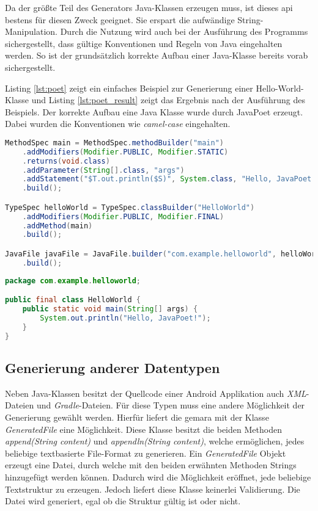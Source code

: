 Da der größte Teil des Generators Java-Klassen erzeugen muss, ist dieses \ac{api} bestens für diesen Zweck geeignet. Sie erspart die aufwändige String-Manipulation. Durch die Nutzung wird auch bei der Ausführung des Programms sichergestellt, dass gültige Konventionen und Regeln von Java eingehalten werden. So ist der grundsätzlich korrekte Aufbau einer Java-Klasse bereits vorab sichergestellt.

Listing \ref{lst:poet} zeigt ein einfaches Beispiel zur Generierung einer Hello-World-Klasse und Listing \ref{lst:poet_result} zeigt das Ergebnis nach der Ausführung des Beispiels. Der korrekte Aufbau eine Java Klasse wurde durch JavaPoet erzeugt. Dabei wurden die Konventionen wie \textit{camel-case} eingehalten.

\begin{lstlisting}[label=lst:poet,
language=java,
firstnumber=1,
caption=Beispiel für die Generation einer Hallo-World-Klasse mit JavaPoet \cite{poet}.]				   
MethodSpec main = MethodSpec.methodBuilder("main")
	.addModifiers(Modifier.PUBLIC, Modifier.STATIC)
	.returns(void.class)
	.addParameter(String[].class, "args")
	.addStatement("$T.out.println($S)", System.class, "Hello, JavaPoet!")
	.build();

TypeSpec helloWorld = TypeSpec.classBuilder("HelloWorld")
	.addModifiers(Modifier.PUBLIC, Modifier.FINAL)
	.addMethod(main)
	.build();

JavaFile javaFile = JavaFile.builder("com.example.helloworld", helloWorld)
	.build();
\end{lstlisting}

\begin{lstlisting}[label=lst:poet_result,
language=java,
firstnumber=1,
caption=Ergebnis der Generation von Listing \ref{lst:poet} \cite{poet}.]				   
package com.example.helloworld;

public final class HelloWorld {
	public static void main(String[] args) {
		System.out.println("Hello, JavaPoet!");
	}
}
\end{lstlisting}

\newpage

\subsection{Generierung anderer Datentypen}

Neben Java-Klassen besitzt der Quellcode einer Android Applikation auch \textit{XML}-Dateien und \textit{Gradle}-Dateien. Für diese Typen muss eine andere Möglichkeit der Generierung gewählt werden. Hierfür liefert die \acf{gemara} mit der Klasse \textit{GeneratedFile} eine Möglichkeit. Diese Klasse besitzt die beiden Methoden \textit{append(String content)} und \textit{appendln(String content)}, welche ermöglichen, jedes beliebige textbasierte File-Format zu generieren. Ein \textit{GeneratedFile} Objekt erzeugt eine Datei, durch welche mit den beiden erwähnten Methoden Strings hinzugefügt werden können. Dadurch wird die Möglichkeit eröffnet, jede beliebige Textstruktur zu erzeugen. Jedoch liefert diese Klasse keinerlei Validierung. Die Datei wird generiert, egal ob die Struktur gültig ist oder nicht.

